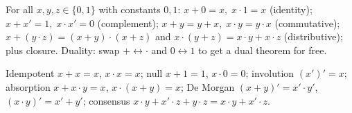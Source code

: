 \begin{definition}
For all $x,y,z\in\{0,1\}$ with constants $0,1$:
$ x+0=x,\;x\cdot1=x$ (identity); $x+x'=1,\;x\cdot x'=0$ (complement);
$x+y=y+x,\;x\cdot y=y\cdot x$ (commutative); $x+(y\cdot z)=(x+y)\cdot(x+z)$ and
$x\cdot(y+z)=x\cdot y+x\cdot z$ (distributive); plus closure.
Duality: swap $+\leftrightarrow\cdot$ and $0\leftrightarrow1$ to get a dual theorem for free.
\end{definition}

\begin{theorem}
Idempotent $x+x=x$, $x\cdot x=x$; null $x+1=1$, $x\cdot0=0$; involution $(x')'=x$;
absorption $x+x\cdot y=x$, $x\cdot(x+y)=x$; De Morgan $(x+y)'=x'\cdot y'$, $(x\cdot y)'=x'+y'$;
consensus $x\cdot y+x'\cdot z+y\cdot z=x\cdot y+x'\cdot z$.
\end{theorem}

